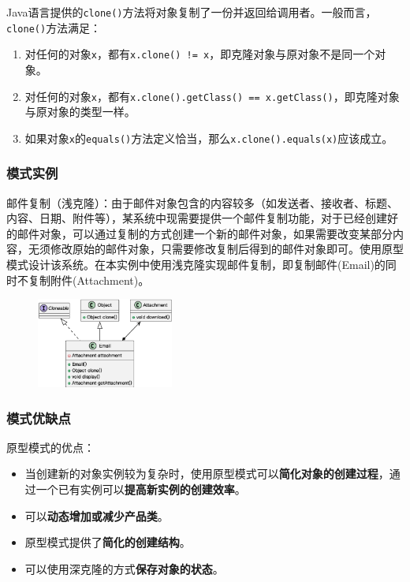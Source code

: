 \vspace{-0.5em}
\begin{shaded}
Java语言提供的\;\verb|clone()|\;方法将对象复制了一份并返回给调用者。一般而言，\;\verb|clone()|\;方法满足：
\begin{enumerate}[label=(\arabic*)]
    \item 对任何的对象\;\verb|x|，都有\;\verb|x.clone() != x|，即克隆对象与原对象不是同一个对象。
    \item 对任何的对象\;\verb|x|，都有\;\verb|x.clone().getClass() == x.getClass()|，即克隆对象与原对象的类型一样。
    \item 如果对象\;\verb|x|\;的\;\verb|equals()|\;方法定义恰当，那么\;\verb|x.clone().equals(x)|\;应该成立。
\end{enumerate}
\end{shaded}
\vspace{-1em}

\subsubsection{模式实例}
邮件复制（浅克隆）：由于邮件对象包含的内容较多（如发送者、接收者、标题、内容、日期、附件等），某系统中现需要提供一个邮件复制功能，对于已经创建好的邮件对象，可以通过复制的方式创建一个新的邮件对象，如果需要改变某部分内容，无须修改原始的邮件对象，只需要修改复制后得到的邮件对象即可。使用原型模式设计该系统。在本实例中使用浅克隆实现邮件复制，即复制邮件(Email)的同时不复制附件(Attachment)。
\begin{figure}[H]
    \vspace{-0.5em}
	\centering
	\includegraphics[width=0.4\textwidth]{images/原型模式实例.eps}
    \vspace{-1em}
\end{figure}

\subsubsection{模式优缺点}
原型模式的优点：
\begin{itemize}
    \item 当创建新的对象实例较为复杂时，使用原型模式可以\textbf{简化对象的创建过程}，通过一个已有实例可以\textbf{提高新实例的创建效率}。
    \item 可以\textbf{动态增加或减少产品类}。
    \item 原型模式提供了\textbf{简化的创建结构}。
    \item 可以使用深克隆的方式\textbf{保存对象的状态}。
\end{itemize}


